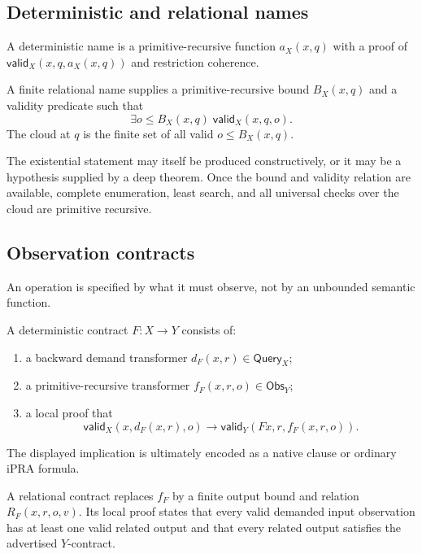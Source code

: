 \subsection{Deterministic and relational names}

\begin{definition}
A deterministic name is a primitive-recursive function
\(a_X(x,q)\) with a proof of
\(\mathsf{valid}_X(x,q,a_X(x,q))\) and restriction coherence.
\end{definition}

\begin{definition}
A finite relational name supplies a primitive-recursive bound \(B_X(x,q)\) and
a validity predicate such that
\[
        \exists o\le B_X(x,q)\;\mathsf{valid}_X(x,q,o).
\]
The cloud at \(q\) is the finite set of all valid \(o\le B_X(x,q)\).
\end{definition}

The existential statement may itself be produced constructively, or it may be
a hypothesis supplied by a deep theorem.  Once the bound and validity relation
are available, complete enumeration, least search, and all universal checks
over the cloud are primitive recursive.

\subsection{Observation contracts}

An operation is specified by what it must observe, not by an unbounded semantic
function.

\begin{definition}
A deterministic contract \(F:X\to Y\) consists of:
\begin{enumerate}
\item a backward demand transformer
\(d_F(x,r)\in\mathsf{Query}_X\);
\item a primitive-recursive transformer
\(f_F(x,r,o)\in\mathsf{Obs}_Y\);
\item a local proof that
\[
 \mathsf{valid}_X(x,d_F(x,r),o)
 \longrightarrow
 \mathsf{valid}_Y(Fx,r,f_F(x,r,o)).
\]
\end{enumerate}
The displayed implication is ultimately encoded as a native clause or ordinary
iPRA formula.
\end{definition}

\begin{definition}
A relational contract replaces \(f_F\) by a finite output bound and relation
\(R_F(x,r,o,v)\).  Its local proof states that every valid demanded input
observation has at least one valid related output and that every related output
satisfies the advertised \(Y\)-contract.
\end{definition}

